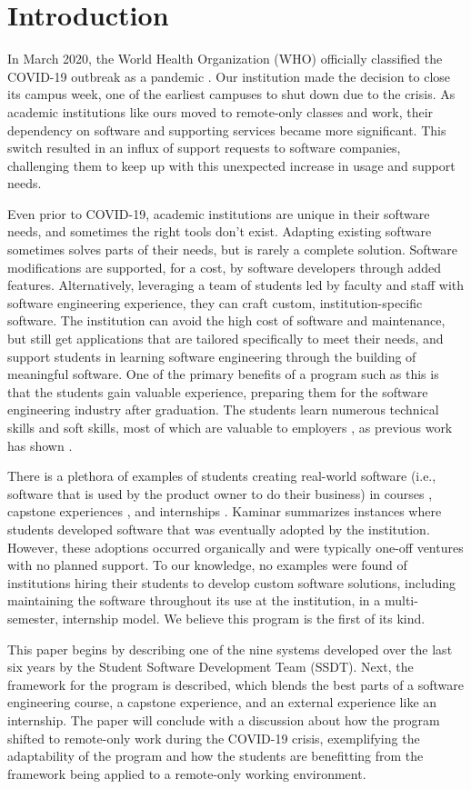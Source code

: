 \section{Introduction}

In March 2020, the World Health Organization (WHO) officially classified the COVID-19 outbreak as a pandemic \cite{covid}. Our institution made the decision to close its campus week, one of the earliest campuses to shut down due to the crisis. As academic institutions like ours moved to remote-only classes and work, their dependency on software and supporting services became more significant. This switch resulted in an influx of support requests to software companies, challenging them to keep up with this unexpected increase in usage and support needs.

Even prior to COVID-19, academic institutions are unique in their software needs, and sometimes the right tools don't exist. Adapting existing software sometimes solves parts of their needs, but is rarely a complete solution. Software modifications are supported, for a cost, by software developers through added features. Alternatively, leveraging a team of students led by faculty and staff with software engineering experience, they can craft custom, institution-specific software. The institution can avoid the high cost of software and maintenance, but still get applications that are tailored specifically to meet their needs, and support students in learning software engineering through the building of meaningful software. One of the primary benefits of a program such as this is that the students gain valuable experience, preparing them for the software engineering industry after graduation. The students learn numerous technical skills and soft skills, most of which are valuable to employers \cite{lavy2013soft}, as previous work has shown \cite{heggen2018hiring}.

There is a plethora of examples of students creating real-world software (i.e., software that is used by the product owner to do their business) in courses \cite{tadayon2004software}, capstone experiences \cite{capstone}, and internships \cite{rochesterfirstundergradsoftwareteam}. Kaminar \cite{kaminer_2014} summarizes instances where students developed software that was eventually adopted by the institution. However, these adoptions occurred organically and were typically one-off ventures with no planned support. To our knowledge, no examples were found of institutions hiring their students to develop custom software solutions, including maintaining the software throughout its use at the institution, in a multi-semester, internship model. We believe this program is the first of its kind.

This paper begins by describing one of the nine systems developed over the last six years by the Student Software Development Team (SSDT). Next, the framework for the program is described, which blends the best parts of a software engineering course, a capstone experience, and an external experience like an internship. The paper will conclude with a discussion about how the program shifted to remote-only work during the COVID-19 crisis, exemplifying the adaptability of the program and how the students are benefitting from the framework being applied to a remote-only working environment.
